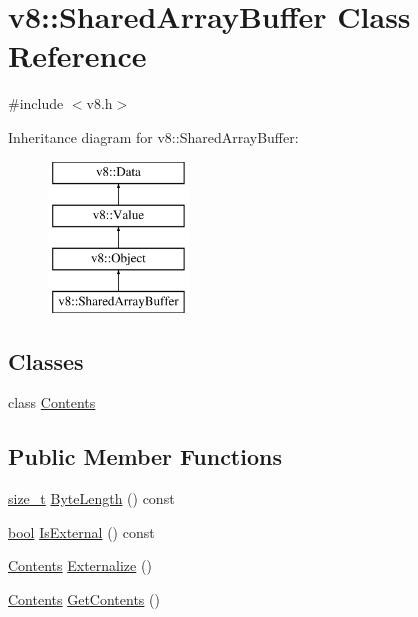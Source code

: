 \hypertarget{classv8_1_1SharedArrayBuffer}{}\section{v8\+:\+:Shared\+Array\+Buffer Class Reference}
\label{classv8_1_1SharedArrayBuffer}


{\ttfamily \#include $<$v8.\+h$>$}

Inheritance diagram for v8\+:\+:Shared\+Array\+Buffer\+:\begin{figure}[H]
\begin{center}
\leavevmode
\includegraphics[height=4.000000cm]{classv8_1_1SharedArrayBuffer}
\end{center}
\end{figure}
\subsection*{Classes}
\begin{DoxyCompactItemize}
\item 
class \mbox{\hyperlink{classv8_1_1SharedArrayBuffer_1_1Contents}{Contents}}
\end{DoxyCompactItemize}
\subsection*{Public Member Functions}
\begin{DoxyCompactItemize}
\item 
\mbox{\hyperlink{classsize__t}{size\+\_\+t}} \mbox{\hyperlink{classv8_1_1SharedArrayBuffer_a746f2632ad6c2d80e8f2e5e6e5b77f94}{Byte\+Length}} () const
\item 
\mbox{\hyperlink{classbool}{bool}} \mbox{\hyperlink{classv8_1_1SharedArrayBuffer_adcbceac6432955c7d54fceea27c92b73}{Is\+External}} () const
\item 
\mbox{\hyperlink{classv8_1_1SharedArrayBuffer_1_1Contents}{Contents}} \mbox{\hyperlink{classv8_1_1SharedArrayBuffer_a5e3308ea38c81c37d5c3fc08fc1a6696}{Externalize}} ()
\item 
\mbox{\hyperlink{classv8_1_1SharedArrayBuffer_1_1Contents}{Contents}} \mbox{\hyperlink{classv8_1_1SharedArrayBuffer_a7267c4156bea02154afa6c8fc5b1f4d8}{Get\+Contents}} ()
\end{DoxyCompactItemize}
